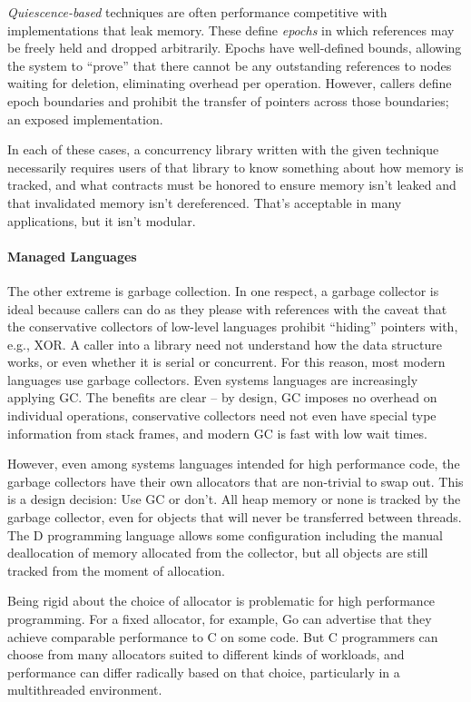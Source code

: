 \textit{Quiescence-based} techniques\cite{FraserH07, Harris, Hart} are often performance competitive with implementations that leak memory.  These define \textit{epochs} in which references may be freely held and dropped arbitrarily.  Epochs have well-defined bounds, allowing the system to ``prove'' that there cannot be any outstanding references to nodes waiting for deletion, eliminating overhead per operation.  However, callers define epoch boundaries and prohibit the transfer of pointers across those boundaries; an exposed implementation.

In each of these cases, a concurrency library written with the given technique necessarily requires users of that library to know something about how memory is tracked, and what contracts must be honored to ensure memory isn't leaked and that invalidated memory isn't dereferenced.  That's acceptable in many applications, but it isn't modular.

\paragraph{Managed Languages} The other extreme is garbage collection.  In one respect, a garbage collector is ideal because callers can do as they please with references with the caveat that the conservative collectors of low-level languages prohibit ``hiding'' pointers with, e.g., XOR.  A caller into a library need not understand how the data structure works, or even whether it is serial or concurrent.  For this reason, most modern languages use garbage collectors.  Even systems languages are increasingly applying GC.  The benefits are clear -- by design, GC imposes no overhead on individual operations, conservative collectors need not even have special type information from stack frames, and modern GC is fast with low wait times.\cite{ShahriyarBM14}

However, even among systems languages intended for high performance code, the garbage collectors have their own allocators that are non-trivial to swap out.\cite{Go, DotNetGC, D}  This is a design decision: Use GC or don't.  All heap memory or none is tracked by the garbage collector, even for objects that will never be transferred between threads.  The D programming language allows some configuration including the manual deallocation of memory allocated from the collector, but all objects are still tracked from the moment of allocation.\cite{DPhobos}

Being rigid about the choice of allocator is problematic for high performance programming.  For a fixed allocator, for example, Go can advertise that they achieve comparable performance to C on some code.  But C programmers can choose from many allocators suited to different kinds of workloads, and performance can differ radically based on that choice, particularly in a multithreaded environment.\cite{Hoard, TCMalloc, JEMalloc, Supermalloc}

